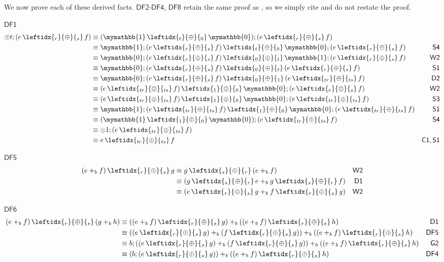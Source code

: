 \documentclass[a4paper,UKenglish,cleveref, autoref, thm-restate]{lipics-v2021}
\newcommand{\WC}[2]{\,\leftidx{_{#1}}{{\oplus}}{_{#2}}\,}
\newcommand{\Ax}[1]{\ensuremath{\mathsf{#1}}}
\newcommand{\bskip}{\mymathbb{1}}
\newcommand{\babort}{\mymathbb{0}}
\newcommand{\gkat}{\textsf{\upshape{GKAT}}\xspace}
\theoremstyle{plain}\newtheoremrep{thm}{Theorem}[section]
\begin{document}
	\begin{appendixproof}
		We now prove each of these derived facts. \Ax{DF2}-\Ax{DF4}, \Ax{DF8} retain the same proof as \gkat, so we simply cite \gkat \cite{Smolka_2019} and do not restate the proof.
		\item[\Ax{DF1}]
		\begin{align*}
			\odot t;(e \WC{r}{s} f) &\equiv (\bskip \WC{t}{0} \babort);(e \WC{r}{s} f) &\\
			&\equiv \bskip;(e \WC{r}{s} f) \WC{t}{0} \babort;(e \WC{r}{s} f) & \Ax{S4}\\
			&\equiv \babort;(e \WC{r}{s} f)\WC{0}{t} \bskip;(e \WC{r}{s} f)  & \Ax{W2}\\
			&\equiv \babort;(e \WC{r}{s} f)\WC{0}{t} (e \WC{r}{s} f)  & \Ax{S1}\\
			&\equiv \babort;(e \WC{r}{s} f)\WC{0}{1} (e \WC{tr}{ts} f)  & \Ax{D2}\\
			&\equiv (e \WC{tr}{ts} f)\WC{1}{0} \babort;(e \WC{r}{s} f)  & \Ax{W2}\\
			&\equiv (e \WC{tr}{ts} f)\WC{1}{0} \babort;(e \WC{tr}{ts} f)  & \Ax{S3}\\
			&\equiv \bskip;(e \WC{tr}{ts} f)\WC{1}{0} \babort;(e \WC{tr}{ts} f)  & \Ax{S1}\\
			&\equiv (\bskip \WC{1}{0} \babort);(e \WC{tr}{ts} f) & \Ax{S4}\\
			&\equiv \odot 1;(e \WC{tr}{ts} f) &\\
			&\equiv e \WC{tr}{ts} f & \Ax{C1}, \Ax{S1}
		\end{align*}
		\item[\Ax{DF5}]
		\begin{align*}
			(e+_b f)\WC{r}{s} g &\equiv g \WC{s}{r} (e+_b f) &\Ax{W2}\\
			&\equiv (g \WC{s}{r}e+_b g \WC{s}{r}f) &\Ax{D1}\\
			&\equiv (e\WC{r}{s} g+_b f \WC{r}{s} g) &\Ax{W2}
		\end{align*}
		\item[\Ax{DF6}]
		\begin{align*}
			(e+_b f) \WC{r}{s} (g+_b h) &\equiv ((e+_b f)\WC{r}{s} g) +_b ((e +_b f)\WC{r}{s} h)&\Ax{D1}\\
			&\equiv ((e \WC{r}{s} g)+_b (f \WC{r}{s} g)) +_b ((e +_b f)\WC{r}{s} h)&\Ax{DF5}\\
			&\equiv b;((e \WC{r}{s} g)+_b (f \WC{r}{s} g)) +_b ((e +_b f)\WC{r}{s} h)&\Ax{G2}\\
			&\equiv (b;(e \WC{r}{s} g)) +_b ((e +_b f)\WC{r}{s} h)&\Ax{DF4}\\

\end{align*}
\end{appendixproof}
\end{document}
